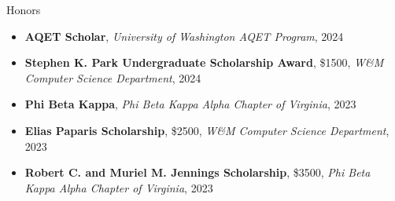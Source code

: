 \begin{rSection}{Honors}
\begin{itemize}
	\item \textbf {AQET Scholar}, \textit {University of Washington AQET Program}, 2024
	\item \textbf {Stephen K. Park Undergraduate Scholarship Award}, \$1500, \textit {W\&M Computer Science Department}, 2024
	\item \textbf {Phi Beta Kappa}, \textit {Phi Beta Kappa Alpha Chapter of Virginia}, 2023
	\item \textbf {Elias Paparis Scholarship}, \$2500, \textit {W\&M Computer Science Department}, 2023
	\item \textbf {Robert C. and Muriel M. Jennings Scholarship}, \$3500, \textit {Phi Beta Kappa Alpha Chapter of Virginia}, 2023
\end{itemize}
\end{rSection}